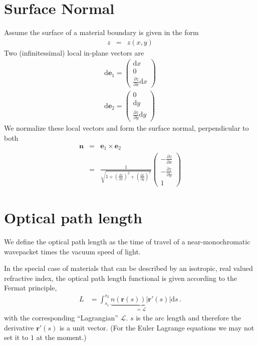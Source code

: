 \documentclass[12pt,a4paper,twoside,openright,BCOR10mm,headsepline,titlepage,abstracton,chapterprefix,final]{scrreprt}
\newcommand\Vector[1]{{\mathbf{#1}}}
\renewcommand\d{\textrm{d}}
\begin{document}
\section{Surface Normal}
Assume the surface of a material boundary is given in the form
\begin{eqnarray}
 z &=& z(x,y)
\end{eqnarray}
Two (infinitessimal) local in-plane vectors are 
\begin{eqnarray}
\d \Vector{e}_1 = \begin{pmatrix}
                 \d x \\ 0 \\ \frac{\partial z}{\partial x} \d x
                \end{pmatrix}
\\
\d \Vector{e}_2 = \begin{pmatrix}
                 0 \\ \d y \\ \frac{\partial z}{\partial y} \d y
                \end{pmatrix}
\end{eqnarray}
We normalize these local vectors and form the surface normal, perpendicular to both
\begin{eqnarray}
 \Vector{n} &=& \Vector{e}_1 \times \Vector{e}_2 \\
 &=& 
   \frac{1}{\sqrt{ 1 + \left( \frac{\partial z}{\partial x} \right)^2 + \left( \frac{\partial z}{\partial y} \right)^2 }}
   \begin{pmatrix}
    - \frac{\partial z}{\partial x} \\ - \frac{\partial z}{\partial y} \\ 1
   \end{pmatrix}
\end{eqnarray}

\section{Optical path length}
We define the optical path length as the time of travel of a near-monochromatic wavepacket times the vacuum speed of light.

In the special case of materials that can be described by an isotropic, real valued refractive index, the optical path length functional is given according to the Fermat principle,
\begin{align}
 L &= \int_{s_1}^{s_2} \underbrace{n(\Vector{r}(s)) |\Vector{r}'(s)|}_{=\mathcal{L}} \d s\,.\label{eq:fermatiso}
\end{align}
with the corresponding ``Lagrangian'' $\mathcal{L}$.
$s$ is the arc length and therefore the derivative $\Vector{r}'(s)$ is a unit vector. (For the Euler Lagrange
equations we may not set it to $1$ at the moment.)
\end{document}
